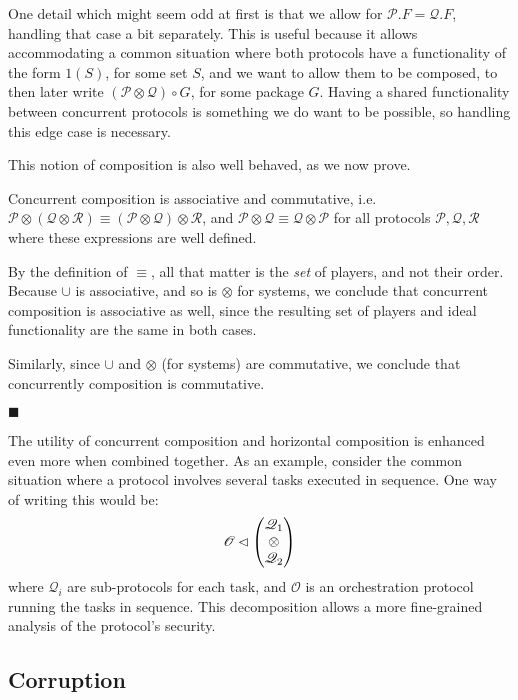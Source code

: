 One detail which might seem odd at first is that we allow
for $\mathscr{P}.F = \mathscr{Q}.F$, handling that case a bit separately.
This is useful because it allows accommodating a common situation
where both protocols have a functionality of the form $1(S)$,
for some set $S$, and we want to allow them to be composed,
to then later write $(\mathscr{P} \otimes \mathscr{Q}) \circ G$,
for some package $G$.
Having a shared functionality between concurrent protocols
is something we do want to be possible, so handling
this edge case is necessary.

This notion of composition is also well behaved, as we now prove.

\begin{lemma}
Concurrent composition is associative and commutative,
i.e. $\mathscr{P} \otimes (\mathscr{Q} \otimes \mathscr{R}) \equiv (\mathscr{P} \otimes \mathscr{Q}) \otimes \mathscr{R}$,
and $\mathscr{P} \otimes \mathscr{Q} \equiv \mathscr{Q} \otimes \mathscr{P}$ for
all protocols $\mathscr{P}, \mathscr{Q}, \mathscr{R}$ where these expressions
are well defined.


By the definition of $\equiv$, all that matter is the \emph{set} of players,
and not their order.
Because $\cup$ is associative, and so is $\otimes$ for systems,
we conclude that concurrent composition is associative as well,
since the resulting set of players and ideal functionality are the same
in both cases.

Similarly, since $\cup$ and $\otimes$ (for systems) are commutative,
we conclude that concurrently composition is commutative.

$\blacksquare$
\end{lemma}

The utility of concurrent composition and horizontal composition
is enhanced even more when combined together.
As an example, consider the common situation where a
protocol involves several tasks executed in sequence.
One way of writing this would be:
$$
\mathscr{O} \lhd
\begin{pmatrix}
  \mathscr{Q}_1\cr
  \otimes\cr
  \mathscr{Q}_2
\end{pmatrix}
$$
where $\mathscr{Q}_i$ are sub-protocols for each task,
and $\mathscr{O}$ is an orchestration protocol running the tasks in sequence.
This decomposition allows a more fine-grained analysis of the protocol's
security.

\subsection{Corruption}

